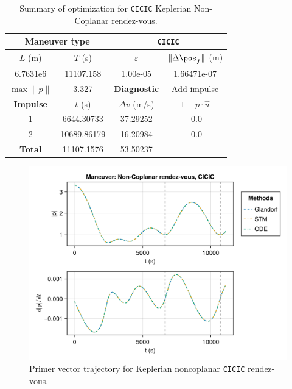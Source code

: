 \begin{table}[htpb]
    \centering
    \begin{tabular}{cccc} \toprule
    \multicolumn{2}{c}{\textbf{Maneuver type}} & \multicolumn{2}{c}{\texttt{CICIC}} \\ \midrule
    \(L\) (m) & \(T\) (s) & \(\varepsilon\) & \(\lVert \Delta \pos_{f} \rVert\) (m)    \\ \midrule
    6.7631e6          & 11107.158          & 1.00e-05                & 1.66471e-07                        \\ \midrule
    \(\max \lVert p \rVert\) & 3.327     & \textbf{Diagnostic}   & Add impulse        \\ \midrule
    \textbf{Impulse} & \(t\) (s) & \(\Delta v\) (m/s) & \(1 - p \cdot \hat{u}\) \\ \midrule
    1                 & 6644.30733          & 37.29252             & -0.0                    \\
    2                 & 10689.86179          & 16.20984             & -0.0                    \\\midrule
    \textbf{Total}   & 11107.1576          & 53.50237             &                     \\ \bottomrule   
    \end{tabular}
    \caption{Summary of optimization for \texttt{CICIC} Keplerian Non-Coplanar rendez-vous.}
    \label{tab:tb_nr_CICIC_tab}
\end{table}

\begin{figure}[htbp]
    \centering
    \includegraphics[width=\linewidth]{../results/two_body/ipv_noncop/CICIC_primer_vector.png}
    \caption{Primer vector trajectory for Keplerian noncoplanar \texttt{CICIC} rendez-vous.}
    \label{fig:tb_ncop_CICIC_pv}
\end{figure}

